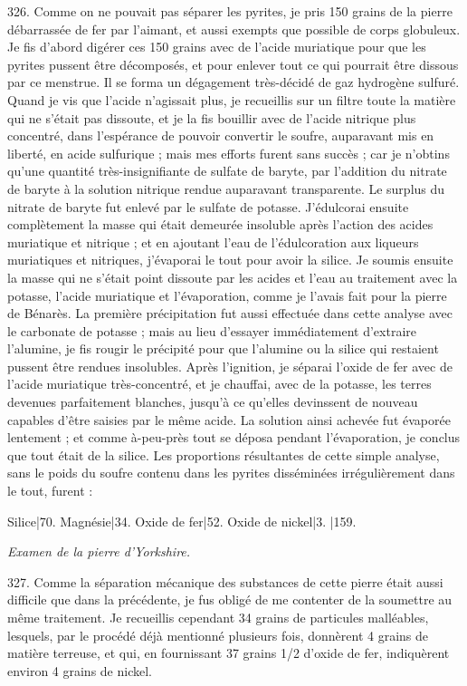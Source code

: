 \documentclass[a4paper, 11pt, oneside, polutonikogreek, french]{article}
\begin{document}
326. Comme on ne pouvait pas séparer les pyrites, je pris 150 grains de la pierre débarrassée de fer par l'aimant, et aussi exempts que possible de corps globuleux. Je fis d'abord digérer ces 150 grains avec de l'acide muriatique pour que les pyrites pussent être décomposés, et pour enlever tout ce qui pourrait être dissous par ce menstrue. Il se forma un dégagement très-décidé de gaz hydrogène sulfuré. Quand je vis que l'acide n'agissait plus, je recueillis sur un filtre toute la matière qui ne s'était pas dissoute, et je la fis bouillir avec de l'acide nitrique plus concentré, dans l'espérance de pouvoir convertir le soufre, auparavant mis en liberté, en acide sulfurique ; mais mes efforts furent sans succès ; car je n'obtins qu'une quantité très-insignifiante de sulfate de baryte, par l'addition du nitrate de baryte à la solution nitrique rendue auparavant transparente. Le surplus du nitrate de baryte fut enlevé par le sulfate de potasse. J'édulcorai ensuite complètement la masse qui était demeurée insoluble après l'action des acides muriatique et nitrique ; et en ajoutant l'eau de l'édulcoration aux liqueurs muriatiques et nitriques, j'évaporai le tout pour avoir la silice. Je soumis ensuite la masse qui ne s'était point dissoute par les acides et l'eau au traitement avec la potasse, l'acide muriatique et l'évaporation, comme je l'avais fait pour la pierre de Bénarès. La première précipitation fut aussi effectuée dans cette analyse avec le carbonate de potasse ; mais au lieu d'essayer immédiatement d'extraire l'alumine, je fis rougir le précipité pour que l'alumine ou la silice qui restaient pussent être rendues insolubles. Après l'ignition, je séparai l'oxide de fer avec de l'acide muriatique très-concentré, et je chauffai, avec de la potasse, les terres devenues parfaitement blanches, jusqu'à ce qu'elles devinssent de nouveau capables d'être saisies par le même acide. La solution ainsi achevée fut évaporée lentement ; et comme à-peu-près tout se déposa pendant l'évaporation, je conclus que tout était de la silice. Les proportions résultantes de cette simple analyse, sans le poids du soufre contenu dans les pyrites disséminées irrégulièrement dans le tout, furent :

Silice|70.
Magnésie|34.
Oxide de fer|52.
Oxide de nickel|3.
|159.

\emph{Examen de la pierre d'Yorkshire.}

327. Comme la séparation mécanique des substances de cette pierre était aussi difficile que dans la précédente, je fus obligé de me contenter de la soumettre au même traitement. Je recueillis cependant 34 grains de particules malléables, lesquels, par le procédé déjà mentionné plusieurs fois, donnèrent 4 grains de matière terreuse, et qui, en fournissant 37 grains 1/2 d'oxide de fer, indiquèrent environ 4 grains de nickel.
\end{document}

